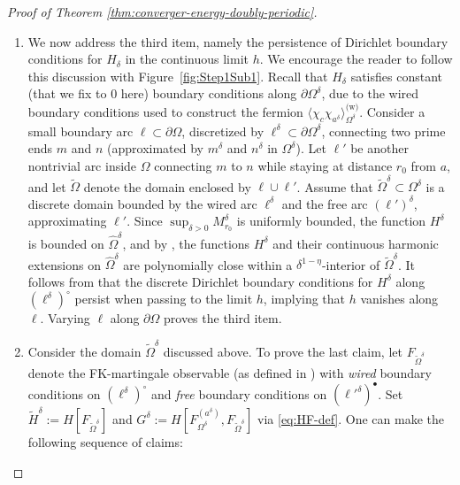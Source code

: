 \documentclass[reqno]{amsart}
\numberwithin{equation}{section}
\theoremstyle{definition}
\theoremstyle{remark}
\begin{document}
\begin{proof}[Proof of Theorem \ref{thm:converger-energy-doubly-periodic}]
\begin{enumerate}
	\item We now address the third item, namely the persistence of Dirichlet boundary conditions for $H_\delta$ in the continuous limit $h$. We encourage the reader to follow this discussion with Figure~\ref{fig:Step1Sub1}. Recall that $H_\delta$ satisfies constant (that we fix to $0$ here) boundary conditions along $\partial \Omega^\delta$, due to the wired boundary conditions used to construct the fermion $\langle \chi_c \chi_{a^\delta} \rangle_{\Omega^\delta}^{\textrm{(w)}}$. Consider a small boundary arc $\ell \subset \partial \Omega$, discretized by $\ell^\delta \subset \partial \Omega^\delta$, connecting two prime ends $m$ and $n$ (approximated by $m^\delta$ and $n^\delta$ in $ \Omega^\delta$). Let $\ell'$ be another nontrivial arc inside $\Omega$ connecting $m$ to $n$ while staying at distance $r_0$ from $a$, and let $\widetilde{\Omega}$ denote the domain enclosed by $\ell \cup \ell'$. Assume that $\widetilde{\Omega}^\delta \subset \Omega^\delta$ is a discrete domain bounded by the wired arc $\ell^\delta$ and the free arc $(\ell')^\delta$, approximating $\ell'$. Since $\sup_{\delta >0}M_{r_0}^{\delta}$ is uniformly bounded, the function $H^\delta$ is bounded on $\hat{\Omega}^\delta$, and by \cite[Theorem~4.1]{Che20}, the functions $H^\delta$ and their continuous harmonic extensions on $\widehat{\Omega}^\delta$ are polynomially close within a $\delta^{1-\eta}$-interior of $\widetilde{\Omega}^\delta$. It follows from \cite[Proof of Theorem~1.2]{Che20} that the discrete Dirichlet boundary conditions for $H^\delta$ along $(\ell^{\delta})^\circ $ persist when passing to the limit $h$, implying that $h$ vanishes along $\ell$. Varying $\ell$ along $\partial \Omega$ proves the third item.
	\item Consider the domain $\widetilde{\Omega}^\delta$ discussed above. To prove the last claim, let $F_{\widetilde{\Omega}^\delta}$ denote the FK-martingale observable (as defined in \cite[Section~2.4]{Che20}) with \emph{wired} boundary conditions on $(\ell^\delta)^\circ$ and \emph{free} boundary conditions on $(\ell'^\delta)^\bullet$. Set $\widetilde{H}^\delta := H[F_{\widetilde{\Omega}^\delta}]$ and $G^\delta := H[F^{(a^\delta)}_{\Omega^\delta}, F_{\widetilde{\Omega}^\delta}]$ via \eqref{eq:HF-def}. One can make the following sequence of claims:
\begin{itemize}

\end{itemize}
\end{enumerate}
\end{proof}
\end{document}
